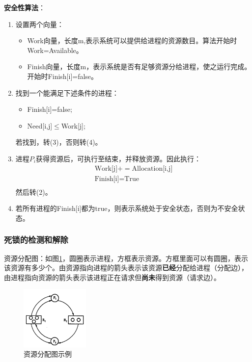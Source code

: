 \documentclass[12pt, a4paper, oneside]{ctexart}
\begin{document}
\textbf{安全性算法}：

\begin{enumerate}
  \item [(1). ] 设置两个向量：
  \begin{itemize}
    \item Work向量，长度m,表示系统可以提供给进程的资源数目。算法开始时Work=Available。
    \item Finish向量，长度m，表示系统是否有足够资源分给进程，使之运行完成。开始时Finish[i]=false。
  \end{itemize}
  \item [(2). ] 找到一个能满足下述条件的进程：
  \begin{itemize}
    \item Finish[i]=false;
    \item Need[i,j]$\leq$Work[j];
  \end{itemize}
  若找到，转(3)，否则转(4)。
  \item [(3). ] 进程$P_i$获得资源后，可执行至结束，并释放资源。因此执行：
  \begin{gather*}
    \text{Work[j]}+=\text{Allocation[i,j]}\\
    \text{Finish[i]}=\text{True}\\
  \end{gather*}
  然后转(2)。
  \item [(4). ] 若所有进程的Finish[i]都为true，则表示系统处于安全状态，否则为不安全状态。
\end{enumerate}

\subsubsection{死锁的检测和解除}

资源分配图：如图\ref{resource_allocation_graph}，圆圈表示进程，方框表示资源。方框里面可以有圆圈，表示该资源有多少个。由资源指向进程的箭头表示该资源\textbf{已经}分配给进程（分配边），由进程指向资源的箭头表示该进程正在请求但\textbf{尚未}得到资源（请求边）。

\begin{figure}
  \centering
  \includegraphics[width=0.3\textwidth]{./images/resource_allocation_graph.png}
  \caption{资源分配图示例}
  \label{resource_allocation_graph}
\end{figure}
\end{document}
